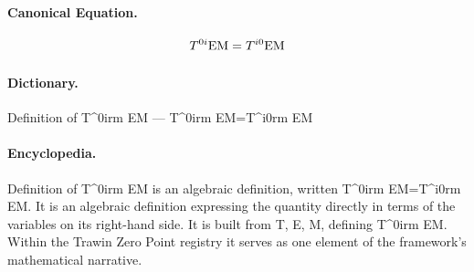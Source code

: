 \paragraph{Canonical Equation.}
\[
T^{0i}{\rm EM}=T^{i0}{\rm EM}
\]

\paragraph{Dictionary.}
Definition of T\textasciicircum{}0irm EM — T\textasciicircum{}0irm EM=T\textasciicircum{}i0rm EM

\paragraph{Encyclopedia.}
Definition of T\textasciicircum{}0irm EM is an algebraic definition, written T\textasciicircum{}0irm EM=T\textasciicircum{}i0rm EM. It is an algebraic definition expressing the quantity directly in terms of the variables on its right-hand side. It is built from T, E, M, defining T\textasciicircum{}0irm EM. Within the Trawin Zero Point registry it serves as one element of the framework's mathematical narrative.
